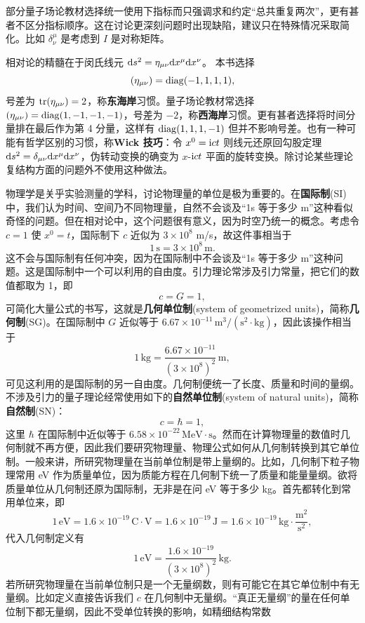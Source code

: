 部分量子场论教材选择统一使用下指标而只强调求和约定“总共重复两次”，更有甚者不区分指标顺序。这在讨论更深刻问题时出现缺陷，建议只在特殊情况采取简化。比如 $\delta^\mu_\nu$ 是考虑到 $I$ 是对称矩阵。

相对论的精髓在于闵氏线元 $\dd s^2=\eta_{\mu\nu}\dd x^\mu\dd x^\nu$。
本书选择
\[({\eta}_{\mu\nu})=\operatorname{diag}(-1,1,1,1),\]
号差为 $\tr(\eta_{\mu\nu})=2$，称\textbf{东海岸}习惯。量子场论教材常选择 $(\eta_{\mu\nu})=\operatorname{diag}(1,-1,-1,-1)$，号差为 $-2$，称\textbf{西海岸}习惯。更有甚者选择将时间分量排在最后作为第 4 分量，这样有 $\operatorname{diag}(1,1,1,-1)$ 但并不影响号差。也有一种可能有哲学区别的习惯，称\textbf{Wick 技巧}：令 $x^0=\mathrm{i} ct$ 则线元还原回勾股定理 $\dd s^2= \delta_{\mu\nu}\dd x^\mu\dd x^\nu$，伪转动变换的确变为 $x$-$\mathrm{i} ct$ 平面的旋转变换。除讨论某些理论复结构方面的问题外不使用这种做法。

物理学是关乎实验测量的学科，讨论物理量的单位是极为重要的。在\textbf{国际制}(SI)中，我们认为时间、空间乃不同物理量，自然不会谈及“1s 等于多少 m”这种看似奇怪的问题。但在相对论中，这个问题很有意义，因为时空乃统一的概念。考虑令 $c=1$ 使 $x^0=t$，国际制下 $c$ 近似为 $3\times 10^8$ m/s，故这件事相当于
\[
1\,\mathrm s=3\times 10^8\,\mathrm m.
\]
这不会与国际制有任何冲突，因为在国际制中不会谈及“1s 等于多少 m”这种问题。这是国际制中一个可以利用的自由度。引力理论常涉及引力常量，把它们的数值都取为 1，即
\[
c=G=1,
\]
可简化大量公式的书写，这就是\textbf{几何单位制}(system of geometrized units)，简称\textbf{几何制}(SG)。在国际制中 $G$ 近似等于 $6.67\times 10^{-11}\,\mathrm{m}^3/(\mathrm{s}^2\cdot\mathrm{kg})$，因此该操作相当于
\[
1\,\mathrm{kg}=\frac{6.67\times 10^{-11}}{(3\times 10^8)^2} \,\mathrm{m},
\]
可见这利用的是国际制的另一自由度。几何制便统一了长度、质量和时间的量纲。不涉及引力的量子理论经常使用如下的\textbf{自然单位制}(system of natural units)，简称\textbf{自然制}(SN)：
\[
c=\hbar=1,
\]
这里 $\hbar$ 在国际制中近似等于 $6.58\times 10^{-22}\,\mathrm{MeV}\cdot\mathrm s$。然而在计算物理量的数值时几何制就不再方便，因此我们要研究物理量、物理公式如何从几何制转换到其它单位制。一般来讲，所研究物理量在当前单位制是带上量纲的。比如，几何制下粒子物理常用 eV 作为质量单位，因为质能方程在几何制下统一了质量和能量量纲。欲将质量单位从几何制还原为国际制，无非是在问 eV 等于多少 kg。首先都转化到常用单位来，即
\[
1\,\mathrm{eV}=1.6 \times 10^{-19}\,\mathrm{C}\cdot\mathrm{V}=1.6\times 10^{-19}\,\mathrm{J}=1.6\times 10^{-19}\,\mathrm{kg}\cdot\frac{\mathrm{m}^2}{\mathrm{s}^2},
\]
代入几何制定义有
\[
1\,\mathrm{eV}=\frac{1.6\times 10^{-19}}{(3\times 10^8)^2}\,\mathrm{kg}.
\]
若所研究物理量在当前单位制只是一个无量纲数，则有可能它在其它单位制中有无量纲。比如定义直接告诉我们 $c$ 在几何制中无量纲。“真正无量纲”的量在任何单位制下都无量纲，因此不受单位转换的影响，如精细结构常数
